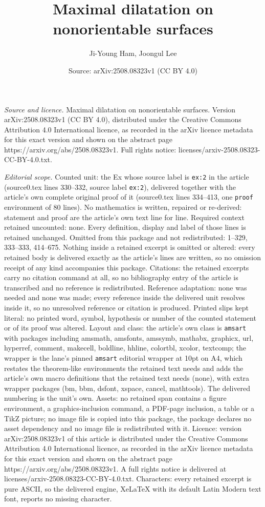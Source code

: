 \documentclass[10pt,a4paper]{amsart}
\title[Maximal dilatation on nonorientable surfaces]{Maximal dilatation on nonorientable surfaces}
\author{Ji-Young Ham, Joongul Lee}
\date{Source: arXiv:2508.08323v1 (CC BY 4.0)}
\begin{document}
\maketitle

\noindent\emph{Source and licence.} Maximal dilatation on nonorientable surfaces. Version arXiv:2508.08323v1 (CC BY 4.0), distributed under the Creative Commons Attribution 4.0 International licence, as recorded in the arXiv licence metadata for this exact version and shown on the abstract page https://arxiv.org/abs/2508.08323v1. Full rights notice: licenses/arxiv-2508.08323-CC-BY-4.0.txt.\par\smallskip

\noindent\textit{Editorial scope.} Counted unit: the Ex whose source label is \texttt{ex:2} in the article (source0.tex lines 330--332, source label \texttt{ex:2}), delivered together with the article's own complete original proof of it (source0.tex lines 334--413, one \texttt{proof} environment of 80 lines). No mathematics is written, repaired or re-derived: statement and proof are the article's own text line for line. Required context retained uncounted: none. Every definition, display and label of those lines is retained unchanged. Omitted from this package and not redistributed: 1--329, 333--333, 414--675. Nothing inside a retained excerpt is omitted or altered: every retained body is delivered exactly as the article's lines are written, so no omission receipt of any kind accompanies this package. Citations: the retained excerpts carry no citation command at all, so no bibliography entry of the article is transcribed and no reference is redistributed. Reference adaptation: none was needed and none was made; every reference inside the delivered unit resolves inside it, so no unresolved reference or citation is produced. Printed slips kept literal: no printed word, symbol, hypothesis or number of the counted statement or of its proof was altered. Layout and class: the article's own class is \texttt{amsart} with packages including amsmath, amsfonts, amssymb, mathabx, graphicx, url, hyperref, comment, makecell, boldline, hhline, colortbl, xcolor, textcomp; the wrapper is the lane's pinned \texttt{amsart} editorial wrapper at 10pt on A4, which restates the theorem-like environments the retained text needs and adds the article's own macro definitions that the retained text needs (none), with extra wrapper packages (bm, bbm, dsfont, xspace, cancel, mathtools). The delivered numbering is the unit's own. Assets: no retained span contains a figure environment, a graphics-inclusion command, a PDF-page inclusion, a table or a TikZ picture; no image file is copied into this package, the package declares no asset dependency and no image file is redistributed with it. Licence: version arXiv:2508.08323v1 of this article is distributed under the Creative Commons Attribution 4.0 International licence, as recorded in the arXiv licence metadata for this exact version and shown on the abstract page https://arxiv.org/abs/2508.08323v1. A full rights notice is delivered at licenses/arxiv-2508.08323-CC-BY-4.0.txt. Characters: every retained excerpt is pure ASCII, so the delivered engine, XeLaTeX with its default Latin Modern text font, reports no missing character.
\end{document}
